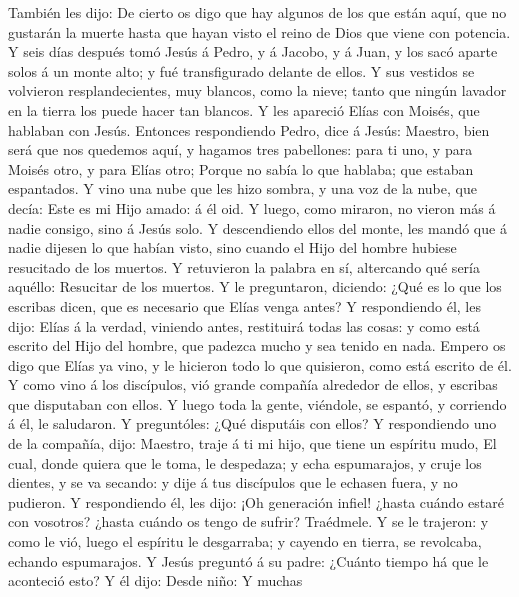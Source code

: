  También les dijo: De cierto os digo que hay algunos de los
que están aquí, que no gustarán la muerte hasta que hayan visto el reino
de Dios que viene con potencia.  Y seis días después tomó
Jesús á Pedro, y á Jacobo, y á Juan, y los sacó aparte solos á un monte
alto; y fué transfigurado delante de ellos.  Y sus vestidos
se volvieron resplandecientes, muy blancos, como la nieve; tanto que
ningún lavador en la tierra los puede hacer tan blancos.  Y
les apareció Elías con Moisés, que hablaban con Jesús. 
Entonces respondiendo Pedro, dice á Jesús: Maestro, bien será que nos
quedemos aquí, y hagamos tres pabellones: para ti uno, y para Moisés
otro, y para Elías otro;  Porque no sabía lo que hablaba;
que estaban espantados.  Y vino una nube que les hizo
sombra, y una voz de la nube, que decía: Este es mi Hijo amado: á él
oid.  Y luego, como miraron, no vieron más á nadie consigo,
sino á Jesús solo.  Y descendiendo ellos del monte, les
mandó que á nadie dijesen lo que habían visto, sino cuando el Hijo del
hombre hubiese resucitado de los muertos.  Y retuvieron la
palabra en sí, altercando qué sería aquéllo: Resucitar de los muertos.
 Y le preguntaron, diciendo: ¿Qué es lo que los escribas
dicen, que es necesario que Elías venga antes?  Y
respondiendo él, les dijo: Elías á la verdad, viniendo antes, restituirá
todas las cosas: y como está escrito del Hijo del hombre, que padezca
mucho y sea tenido en nada.  Empero os digo que Elías ya
vino, y le hicieron todo lo que quisieron, como está escrito de él.
 Y como vino á los discípulos, vió grande compañía
alrededor de ellos, y escribas que disputaban con ellos.  Y
luego toda la gente, viéndole, se espantó, y corriendo á él, le
saludaron.  Y preguntóles: ¿Qué disputáis con ellos?
 Y respondiendo uno de la compañía, dijo: Maestro, traje á
ti mi hijo, que tiene un espíritu mudo,  El cual, donde
quiera que le toma, le despedaza; y echa espumarajos, y cruje los
dientes, y se va secando: y dije á tus discípulos que le echasen fuera,
y no pudieron.  Y respondiendo él, les dijo: ¡Oh generación
infiel! ¿hasta cuándo estaré con vosotros? ¿hasta cuándo os tengo de
sufrir? Traédmele.  Y se le trajeron: y como le vió, luego
el espíritu le desgarraba; y cayendo en tierra, se revolcaba, echando
espumarajos.  Y Jesús preguntó á su padre: ¿Cuánto tiempo
há que le aconteció esto? Y él dijo: Desde niño:  Y muchas
